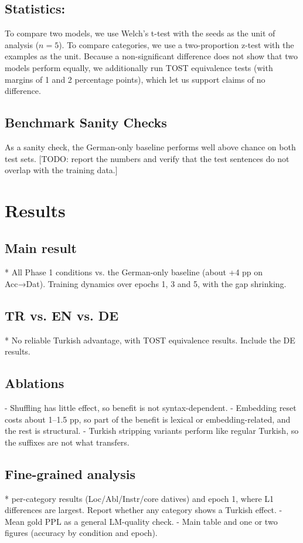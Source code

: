 \documentclass[11pt]{article}
\begin{document}
\subsection{Statistics:}
To compare two models, we use Welch's t-test with the seeds as the unit of analysis ($n = 5$). To compare categories, we use a two-proportion z-test with the examples as the unit. Because a non-significant difference does not show that two models perform equally, we additionally run TOST equivalence tests (with margins of 1 and 2 percentage points), which let us support claims of no difference.

\subsection{Benchmark Sanity Checks}

As a sanity check, the German-only baseline performs well above chance on both test sets. [TODO: report the numbers and verify that the test sentences do not overlap with the training data.]

\section{Results}

\subsection{Main result}
* All Phase 1 conditions vs. the German-only baseline (about +4 pp on Acc→Dat). Training dynamics over epochs 1, 3 and 5, with the gap shrinking.

\subsection{TR vs. EN vs. DE}
* No reliable Turkish advantage, with TOST equivalence results. Include the DE results.

\subsection{Ablations}
- Shuffling has little effect, so benefit is not syntax-dependent.
- Embedding reset costs about 1–1.5 pp, so part of the benefit is lexical or embedding-related, and the rest is structural.
- Turkish stripping variants perform like regular Turkish, so the suffixes are not what transfers.

\subsection{Fine-grained analysis}
* per-category results (Loc/Abl/Instr/core datives) and epoch 1, where L1 differences are largest. Report whether any category shows a Turkish effect.
- Mean gold PPL as a general LM-quality check.
- Main table and one or two figures (accuracy by condition and epoch).
\end{document}
